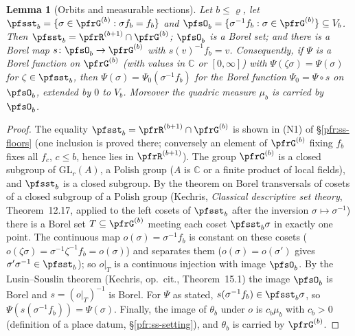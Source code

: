 \documentclass[10pt]{amsart}
\newtheorem{lemma}[theorem]{Lemma}
\theoremstyle{definition}
\theoremstyle{remark}
\newcommand{\C}{\mathbb C}
\begin{document}
\begin{lemma}[Orbits and measurable sections]\label{pfs:section}
Let $b\le\varrho$, let $\pfsst_b=\{\sigma\in\pfrG^{(b)}:\sigma f_b=f_b\}$ and $\pfsO_b=\{\sigma^{-1}f_b:\sigma\in\pfrG^{(b)}\}
\subseteq V_b$. Then $\pfsst_b=\pfrR^{(b+1)}\cap\pfrG^{(b)}$; $\pfsO_b$ is a Borel set; and there is a Borel map
$s\colon\pfsO_b\to\pfrG^{(b)}$ with $s(v)^{-1}f_b=v$. Consequently, if $\Psi$ is a Borel function on $\pfrG^{(b)}$
(with values in $\C$ or $[0,\infty]$) with $\Psi(\zeta\sigma)=\Psi(\sigma)$ for $\zeta\in\pfsst_b$, then
$\Psi(\sigma)=\Psi_0(\sigma^{-1}f_b)$ for the Borel function $\Psi_0=\Psi\circ s$ on $\pfsO_b$, extended by $0$
to $V_b$. Moreover the quadric measure $\mu_b$ is carried by $\pfsO_b$.
\end{lemma}
\begin{proof}
The equality $\pfsst_b=\pfrR^{(b+1)}\cap\pfrG^{(b)}$ is shown in (N1) of \S\ref{pfr:ss-floors} (one inclusion is
proved there; conversely an element of $\pfrG^{(b)}$ fixing $f_b$ fixes all $f_c$, $c\le b$, hence lies in
$\pfrR^{(b+1)}$). The group $\pfrG^{(b)}$ is a closed subgroup of $\mathrm{GL}_r(A)$, a Polish group ($A$ is $\C$ or
a finite product of local fields), and $\pfsst_b$ is a closed subgroup. By the theorem on Borel transversals of
cosets of a closed subgroup of a Polish group (Kechris, \emph{Classical descriptive set theory}, Theorem~12.17,
applied to the left cosets of $\pfsst_b$ after the inversion $\sigma\mapsto\sigma^{-1}$) there is a Borel set $T\subseteq\pfrG^{(b)}$ meeting each coset $\pfsst_b\sigma$ in exactly one
point. The continuous map $o(\sigma)=\sigma^{-1}f_b$ is constant on these cosets ($o(\zeta\sigma)=\sigma^{-1}\zeta^{-1}
f_b=o(\sigma)$) and separates them ($o(\sigma)=o(\sigma')$ gives $\sigma'\sigma^{-1}\in\pfsst_b$); so $o|_T$ is a
continuous injection with image $\pfsO_b$. By the Lusin--Souslin theorem (Kechris, op.\ cit., Theorem~15.1) the
image $\pfsO_b$ is Borel and $s=(o|_T)^{-1}$ is Borel. For $\Psi$ as stated, $s(\sigma^{-1}f_b)\in\pfsst_b\sigma$,
so $\Psi(s(\sigma^{-1}f_b))=\Psi(\sigma)$. Finally, the image of $\theta_b$ under $o$ is $c_b\mu_b$ with $c_b>0$
(definition of a place datum, \S\ref{pfr:ss-setting}), and $\theta_b$ is carried by $\pfrG^{(b)}$.
\end{proof}
\end{document}
